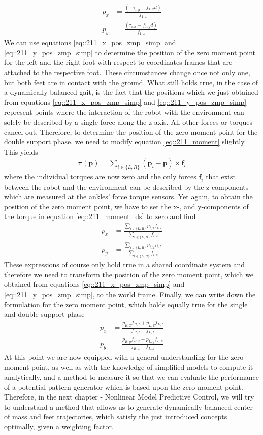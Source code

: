 \begin{align}
	p_x &= \frac{(-\tau_{i,y}-f_{1,x}d)}{f_{1,z}} 
	\label{eq::211_x_pos_zmp_simp}\\
	p_y &= \frac{(\tau_{i,x}-f_{1,y}d)}{f_{1,z}}
	\label{eq::211_y_pos_zmp_simp}
\end{align}
We can use equations \ref{eq::211_x_pos_zmp_simp} and \ref{eq::211_y_pos_zmp_simp} to determine the position of the zero moment point for the left and the right foot with respect to coordinates frames that are attached to the respective foot. These circumstances change once not only one, but both feet are in contact with the ground. What still holds true, in the case of a dynamically balanced gait, is the fact that the positions which we just obtained from equations \ref{eq::211_x_pos_zmp_simp} and \ref{eq::211_y_pos_zmp_simp} represent points where the interaction of the robot with the environment can solely be described by a single force along the z-axis. All other forces or torques cancel out. Therefore, to determine the position of the zero moment point for the double support phase, we need to modify equation \ref{eq::211_moment} slightly. This yields 
\begin{align}
	\bm{\tau}(\bm{p}) = \sum_{i\in\{L, R\}} (\bm{p}_i - \bm{p})\times\bm{f}_i
	\label{eq::211_moment_ds}
\end{align}
where the individual torques are now zero and the only forces $\bm{f}_i$ that exist between the robot and the environment can be described by the z-components which are measured at the ankles' force torque sensors. Yet again, to obtain the position of the zero moment point, we have to set the x-, and y-components of the torque in equation \ref{eq::211_moment_ds} to zero and find
\begin{align}
	p_x &= \frac{\sum_{i\in\{L, R\}}p_{i,x}f_{i,z}}{\sum_{i\in\{L, R\}}f_{i,z}} \\
	p_y &= \frac{\sum_{i\in\{L, R\}}p_{i,y}f_{i,z}}{\sum_{i\in\{L, R\}}f_{i,z}}
\end{align}
These expressions of course only hold true in a shared coordinate system and therefore we need to transform the position of the zero moment point, which we obtained from equations \ref{eq::211_x_pos_zmp_simp} and \ref{eq::211_y_pos_zmp_simp}, to the world frame. Finally, we can write down the formulation for the zero moment point, which holds equally true for the single and double support phase
\begin{align}
	p_x &= \frac{p_{R,x}f_{R,z}+p_{L,x}f_{L,z}}{f_{R,z}+f_{L,z}} 
	\label{eq::211_double_zmp_x} \\
	p_y &= \frac{p_{R,y}f_{R,z}+p_{L,y}f_{L,z}}{f_{R,z}+f_{L,z}}
	\label{eq::211_double_zmp_y}
\end{align}
At this point we are now equipped with a general understanding for the zero moment point, as well as with the knowledge of simplified models to compute it analytically, and a method to measure it so that we can evaluate the performance of a potential pattern generator which is based upon the zero moment point. Therefore, in the next chapter - Nonlinear Model Predictive Control, we will try to understand a method that allows us to generate dynamically balanced center of mass and feet trajectories, which satisfy the just introduced concepts optimally, given a weighting factor.
